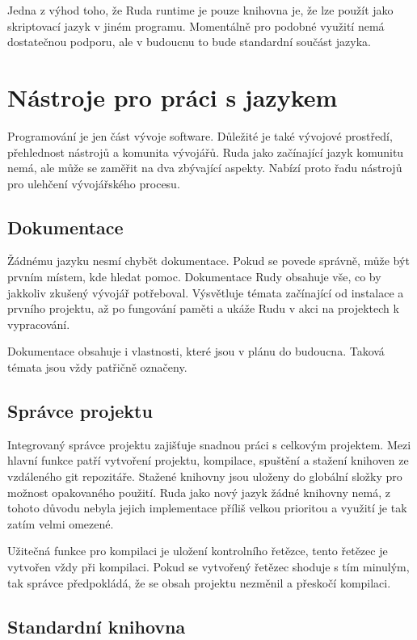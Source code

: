 \documentclass[12pt, a4paper,
twoside,        %
openright
]{report}
\let\oldchapter\chapter
\renewcommand{\chapter}{
	\clearpage
	\pagestyle{fancy}
	\oldchapter
}
\begin{document}
Jedna z výhod toho, že Ruda runtime je pouze knihovna je, že lze použít jako skriptovací jazyk v jiném programu. Momentálně pro podobné využití nemá dostatečnou podporu, ale v budoucnu to bude standardní součást jazyka.

\chapter{Nástroje pro práci s jazykem}

Programování je jen část vývoje software. Důležité je také vývojové prostředí, přehlednost nástrojů a komunita vývojářů. Ruda jako začínající jazyk komunitu nemá, ale může se zaměřit na dva zbývající aspekty. Nabízí proto řadu nástrojů pro ulehčení vývojářského procesu.

\section{Dokumentace}

Žádnému jazyku nesmí chybět dokumentace. Pokud se povede správně, může být prvním místem, kde hledat pomoc. Dokumentace Rudy obsahuje vše, co by jakkoliv zkušený vývojář potřeboval. Výsvětluje témata začínající od instalace a prvního projektu, až po fungování paměti a ukáže Rudu v akci na projektech k vypracování.

Dokumentace obsahuje i vlastnosti, které jsou v plánu do budoucna. Taková témata jsou vždy patřičně označeny.

\section{Správce projektu}

Integrovaný správce projektu zajišťuje snadnou práci s celkovým projektem. Mezi hlavní funkce patří vytvoření projektu, kompilace, spuštění a stažení knihoven ze vzdáleného git repozitáře. Stažené knihovny jsou uloženy do globální složky pro možnost opakovaného použití. Ruda jako nový jazyk žádné knihovny nemá, z tohoto důvodu nebyla jejich implementace příliš velkou prioritou a využití je tak zatím velmi omezené.

Užitečná funkce pro kompilaci je uložení kontrolního řetězce, tento řetězec je vytvořen vždy při kompilaci. Pokud se vytvořený řetězec shoduje s tím minulým, tak správce předpokládá, že se obsah projektu nezměnil a přeskočí kompilaci.

\clearpage

\section{Standardní knihovna}
\end{document}
